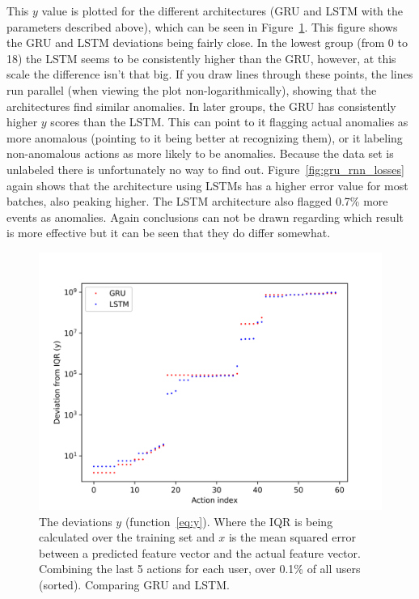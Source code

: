 This \(y\) value is plotted for the different architectures (GRU and LSTM with the parameters described above), which can be seen in Figure~\ref{fig:gru_vs_lstm}. This figure shows the GRU and LSTM deviations being fairly close. In the lowest group (from 0 to 18) the LSTM seems to be consistently higher than the GRU, however, at this scale the difference isn't that big. If you draw lines through these points, the lines run parallel (when viewing the plot non-logarithmically), showing that the architectures find similar anomalies. In later groups, the GRU has consistently higher \(y\) scores than the LSTM. This can point to it flagging actual anomalies as more anomalous (pointing to it being better at recognizing them), or it labeling non-anomalous actions as more likely to be anomalies. Because the data set is unlabeled there is unfortunately no way to find out. Figure~\ref{fig:gru_rnn_losses} again shows that the architecture using LSTMs has a higher error value for most batches, also peaking higher. The LSTM architecture also flagged 0.7\% more events as anomalies. Again conclusions can not be drawn regarding which result is more effective but it can be seen that they do differ somewhat.

\begin{figure}
	\begin{center}
		\includegraphics[scale=3.2]{experiments/cell/deviations/gru_vs_lstm}
	\end{center}
	\caption{The deviations \(y\) (function~\ref{eq:y}). Where the IQR is being calculated over the training set and \(x\) is the mean squared error between a predicted feature vector and the actual feature vector. Combining the last 5 actions for each user, over 0.1\% of all users (sorted). Comparing GRU and LSTM.~\label{fig:gru_vs_lstm}}
\end{figure}

